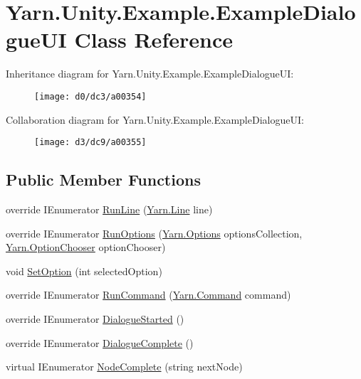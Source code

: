 \hypertarget{a00039}{\section{Yarn.\-Unity.\-Example.\-Example\-Dialogue\-U\-I Class Reference}
\label{a00039}
}


Inheritance diagram for Yarn.\-Unity.\-Example.\-Example\-Dialogue\-U\-I\-:
\nopagebreak
\begin{figure}[H]
\begin{center}
\leavevmode
\texttt{[image: d0/dc3/a00354]}
\end{center}
\end{figure}


Collaboration diagram for Yarn.\-Unity.\-Example.\-Example\-Dialogue\-U\-I\-:
\nopagebreak
\begin{figure}[H]
\begin{center}
\leavevmode
\texttt{[image: d3/dc9/a00355]}
\end{center}
\end{figure}
\subsection*{Public Member Functions}
\begin{DoxyCompactItemize}
\item 
override I\-Enumerator \hyperlink{a00039_a109aeedc5206dcbc4f629638b7830030}{Run\-Line} (\hyperlink{a00026_db/d44/a00162}{Yarn.\-Line} line)
\item 
override I\-Enumerator \hyperlink{a00039_aaa93672700a456e66c694636460a58f4}{Run\-Options} (\hyperlink{a00026_db/ddf/a00164}{Yarn.\-Options} options\-Collection, \hyperlink{a00026_a39866cbb03c03a35805d598b5d4ad553}{Yarn.\-Option\-Chooser} option\-Chooser)
\item 
void \hyperlink{a00039_ad1ac5781ded20d2950d8dd3af506df37}{Set\-Option} (int selected\-Option)
\item 
override I\-Enumerator \hyperlink{a00039_a7f84b1e7d3c9c1f7507d143e11ba8075}{Run\-Command} (\hyperlink{a00026_de/db9/a00159}{Yarn.\-Command} command)
\item 
override I\-Enumerator \hyperlink{a00039_a313283f6c53354b54f25898eb436eba0}{Dialogue\-Started} ()
\item 
override I\-Enumerator \hyperlink{a00039_a1f2a08baacc25aea09af8e60eb5d3eb1}{Dialogue\-Complete} ()
\item 
virtual I\-Enumerator \hyperlink{a00038_a2900548a0704d39d4502a153945f4bef}{Node\-Complete} (string next\-Node)
\end{DoxyCompactItemize}
